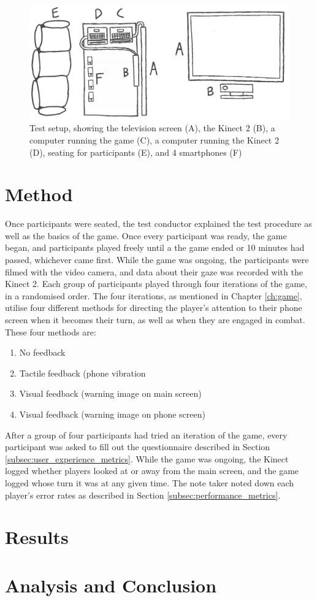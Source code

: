 \begin{figure}[h!]
	\centering
	\includegraphics[width=\textwidth]{figures/test_setup.png}
	\caption{Test setup, showing the television screen (A), the Kinect 2 (B), a computer running the game (C), a computer running the Kinect 2 (D), seating for participants (E), and 4 smartphones (F)}\label{fig:test_setup}
\end{figure}

\section{Method}
Once participants were seated, the test conductor explained the test procedure as well as the basics of the game. Once every participant was ready, the game began, and participants played freely until a the game ended or 10 minutes had passed, whichever came first. While the game was ongoing, the participants were filmed with the video camera, and data about their gaze was recorded with the Kinect 2. Each group of participants played through four iterations of the game, in a randomised order. The four iterations, as mentioned in Chapter \ref{ch:game}, utilise four different methods for directing the player's attention to their phone screen when it becomes their turn, as well as when they are engaged in combat. These four methods are:

\begin{enumerate}[label=\Alph*)]
	\item No feedback
	\item Tactile feedback (phone vibration
	\item Visual feedback (warning image on main screen)
	\item Visual feedback (warning image on phone screen)
\end{enumerate}

After a group of four participants had tried an iteration of the game, every participant was asked to fill out the questionnaire described in Section \ref{subsec:user_experience_metrics}. While the game was ongoing, the Kinect logged whether players looked at or away from the main screen, and the game logged whose turn it was at any given time. The note taker noted down each player's error rates as described in Section \ref{subsec:performance_metrics}.

\section{Results}

\section{Analysis and Conclusion}